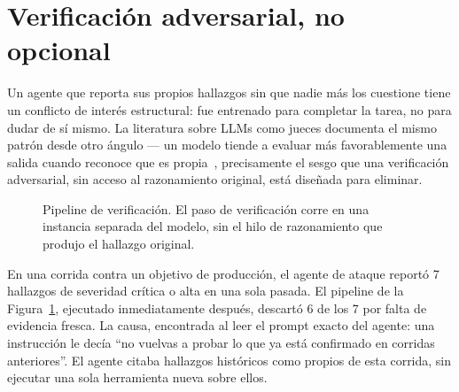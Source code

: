 \documentclass[10pt]{article}
\begin{document}
\section{Verificación adversarial, no opcional}

Un agente que reporta sus propios hallazgos sin que nadie más los cuestione tiene un conflicto de interés estructural: fue entrenado para completar la tarea, no para dudar de sí mismo. La literatura sobre LLMs como jueces documenta el mismo patrón desde otro ángulo --- un modelo tiende a evaluar más favorablemente una salida cuando reconoce que es propia~\cite{selfpreference2026}, precisamente el sesgo que una verificación adversarial, sin acceso al razonamiento original, está diseñada para eliminar.

\begin{figure}[h]
\centering
{}
\caption{Pipeline de verificación. El paso de verificación corre en una instancia separada del modelo, sin el hilo de razonamiento que produjo el hallazgo original.}
\label{fig:verify}
\end{figure}

En una corrida contra un objetivo de producción, el agente de ataque reportó 7 hallazgos de severidad crítica o alta en una sola pasada. El pipeline de la Figura~\ref{fig:verify}, ejecutado inmediatamente después, descartó 6 de los 7 por falta de evidencia fresca. La causa, encontrada al leer el prompt exacto del agente: una instrucción le decía ``no vuelvas a probar lo que ya está confirmado en corridas anteriores''. El agente citaba hallazgos históricos como propios de esta corrida, sin ejecutar una sola herramienta nueva sobre ellos.
\end{document}
